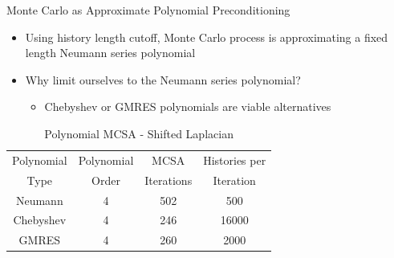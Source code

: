 \documentclass{beamer}
\begin{document}

\begin{frame}{Monte Carlo as Approximate Polynomial Preconditioning}
  \begin{itemize}
    \item Using history length cutoff, Monte Carlo process is approximating
      a fixed length Neumann series polynomial
    \vfill
    \item Why limit ourselves to the Neumann series polynomial?
      \begin{itemize}
        \item Chebyshev or GMRES polynomials are viable alternatives
      \end{itemize}
  \end{itemize}

  \begin{table}
    \caption{Polynomial MCSA - Shifted Laplacian}
    \centering
    \begin{tabular}{cccc}
      \toprule
      Polynomial & Polynomial & MCSA & Histories per \\
      Type & Order & Iterations & Iteration \\
      \midrule
      Neumann & 4 & 502 & 500 \\
      Chebyshev & 4 & 246 & 16000 \\
      GMRES & 4 & 260 & 2000 \\
      \bottomrule
    \end{tabular}
  \end{table}
\end{frame}

\end{document}
